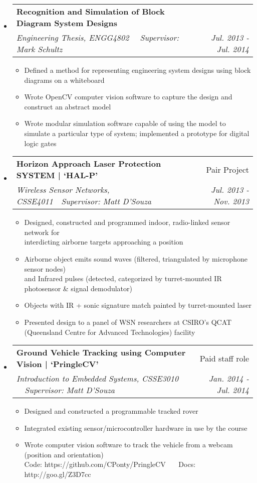 \documentclass[letterpaper,11pt]{article}
\makeatletter
\newcommand{\resitem}[1]{\item #1 \vspace{-2pt}}
\newcommand{\resheading}[1]{{\large \fcolorbox{black}{mygrey}{\begin{minipage}{\textwidth}{\textbf{#1 \vphantom{p\^{E}}}}\end{minipage}}}}
\newcommand{\ressubheading}[4]{
\begin{tabular*}{7.0in}{l@{\extracolsep{\fill}}r}
		\textbf{#1} & #2 \\
		\textit{#3} & \textit{#4} \\
\end{tabular*}\vspace{-6pt}}
\makeatother
\begin{document}
\resheading{University Projects}
\begin{itemize}
\item
	\ressubheading{Recognition and Simulation of Block Diagram System Designs}{}{Engineering Thesis, ENGG4802 \ \textbar \ Supervisor: Mark Schultz}{Jul. 2013 - Jul. 2014}
	\begin{itemize}
		\resitem{Defined a method for representing engineering system designs using block diagrams on a whiteboard}
		\resitem{Wrote OpenCV computer vision software to capture the design and construct an abstract model}
		\resitem{Wrote modular simulation software capable of using the model to simulate a particular type of system; implemented a prototype for digital logic gates}
	\end{itemize}

\item
	\ressubheading{Horizon Approach Laser Protection SYSTEM | `HAL-P'}{Pair Project}{Wireless Sensor Networks, CSSE4011\ \textbar \ Supervisor: Matt D'Souza}{Jul. 2013 - Nov. 2013}
	\begin{itemize}
		\resitem{Designed, constructed and programmed indoor, radio-linked sensor network for \\ interdicting airborne targets approaching a position}
		\resitem{Airborne object emits sound waves (filtered, triangulated by microphone sensor nodes) \\ and Infrared pulses (detected, categorized by turret-mounted IR photosensor \& signal demodulator)}
		\resitem{Objects with IR + sonic signature match painted by turret-mounted laser}
		\resitem{Presented design to a panel of WSN researchers at CSIRO's QCAT (Queensland Centre for Advanced Technologies) facility}
	\end{itemize}

\item
	\ressubheading{Ground Vehicle Tracking using Computer Vision | `PringleCV'}{Paid staff role}{Introduction to Embedded Systems, CSSE3010 \ \textbar \ Supervisor: Matt D'Souza}{Jan. 2014 - Jul. 2014}
	\begin{itemize}
		\resitem{Designed and constructed a programmable tracked rover}
		\resitem{Integrated existing sensor/microcontroller hardware in use by the course}
		\resitem{Wrote computer vision software to track the vehicle from a webcam (position and orientation) }
		\\ \vspace{4 mm} Code: https://github.com/CPonty/PringleCV \ \textbar \ \ Docs: http://goo.gl/Z3D7cc
	\end{itemize}
\end{itemize}
\end{document}
